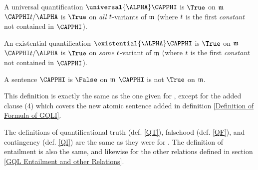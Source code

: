 \begin{majorILnc}{}
\begin{cenumerate}
	\item A universal quantification $\universal{\ALPHA}\CAPPHI$ is $\True$ on $\mathfrak{m}$ \Iff $\CAPPHI\variable{t}/\ALPHA$ is $\True$ on \emph{all} $t$-variants of $\mathfrak{m}$ (where $t$ is the first \emph{constant} not contained in $\CAPPHI$).
	\item An existential quantification $\existential{\ALPHA}\CAPPHI$ is $\True$ on $\mathfrak{m}$ \Iff $\CAPPHI\variable{t}/\ALPHA$ is $\True$ on \emph{some} $t$-variant of $\mathfrak{m}$ (where $t$ is the first \emph{constant} not contained in $\CAPPHI$).
	\item A sentence $\CAPPHI$ is $\False$ on $\mathfrak{m}$ \Iff $\CAPPHI$ is not $\True$ on $\mathfrak{m}$.

\end{cenumerate}
\end{majorILnc}
\noindent{}This definition is exactly the same as the one given for \GQL{}, except for the added clause (4) which covers the new atomic sentence added in definition \ref{Definition of Formula of GQLI}. 

The definitions of quantificational truth (def. \ref{QT}), falsehood (def. \ref{QF}), and contingency (def. \ref{QI}) are the same as they were for \GQL{}. 
The definition of entailment is also the same, and likewise for the other relations defined in section \ref{GQL Entailment and other Relations}.

